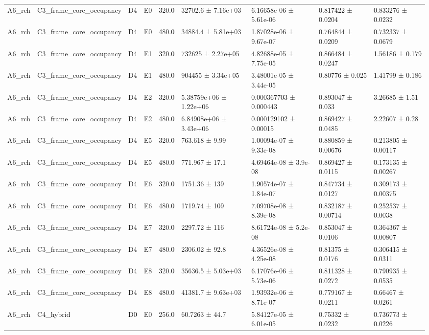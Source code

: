 \begin{table}
\begin{tabular}{lllllllll}
A6\_rch & C3\_frame\_core\_occupancy & D4 & E0 & 320.0 & 32702.6 ± 7.16e+03 & 6.16658e-06 ± 5.61e-06 & 0.817422 ± 0.0204 & 0.833276 ± 0.0232 \\
A6\_rch & C3\_frame\_core\_occupancy & D4 & E0 & 480.0 & 34884.4 ± 5.81e+03 & 1.87028e-06 ± 9.67e-07 & 0.764844 ± 0.0209 & 0.732337 ± 0.0679 \\
A6\_rch & C3\_frame\_core\_occupancy & D4 & E1 & 320.0 & 732625 ± 2.27e+05 & 4.82688e-05 ± 7.75e-05 & 0.866484 ± 0.0247 & 1.56186 ± 0.179 \\
A6\_rch & C3\_frame\_core\_occupancy & D4 & E1 & 480.0 & 904455 ± 3.34e+05 & 3.48001e-05 ± 3.44e-05 & 0.80776 ± 0.025 & 1.41799 ± 0.186 \\
A6\_rch & C3\_frame\_core\_occupancy & D4 & E2 & 320.0 & 5.38759e+06 ± 1.22e+06 & 0.000367703 ± 0.000443 & 0.893047 ± 0.033 & 3.26685 ± 1.51 \\
A6\_rch & C3\_frame\_core\_occupancy & D4 & E2 & 480.0 & 6.84908e+06 ± 3.43e+06 & 0.000129102 ± 0.00015 & 0.869427 ± 0.0485 & 2.22607 ± 0.28 \\
A6\_rch & C3\_frame\_core\_occupancy & D4 & E5 & 320.0 & 763.618 ± 9.99 & 1.00094e-07 ± 9.33e-08 & 0.880859 ± 0.00676 & 0.213805 ± 0.00117 \\
A6\_rch & C3\_frame\_core\_occupancy & D4 & E5 & 480.0 & 771.967 ± 17.1 & 4.69464e-08 ± 3.9e-08 & 0.869427 ± 0.0115 & 0.173135 ± 0.00267 \\
A6\_rch & C3\_frame\_core\_occupancy & D4 & E6 & 320.0 & 1751.36 ± 139 & 1.90574e-07 ± 1.84e-07 & 0.847734 ± 0.0127 & 0.309173 ± 0.00375 \\
A6\_rch & C3\_frame\_core\_occupancy & D4 & E6 & 480.0 & 1719.74 ± 109 & 7.09708e-08 ± 8.39e-08 & 0.832187 ± 0.00714 & 0.252537 ± 0.0038 \\
A6\_rch & C3\_frame\_core\_occupancy & D4 & E7 & 320.0 & 2297.72 ± 116 & 8.61724e-08 ± 5.2e-08 & 0.853047 ± 0.0106 & 0.364367 ± 0.00807 \\
A6\_rch & C3\_frame\_core\_occupancy & D4 & E7 & 480.0 & 2306.02 ± 92.8 & 4.36526e-08 ± 4.25e-08 & 0.81375 ± 0.0176 & 0.306415 ± 0.0311 \\
A6\_rch & C3\_frame\_core\_occupancy & D4 & E8 & 320.0 & 35636.5 ± 5.03e+03 & 6.17076e-06 ± 5.73e-06 & 0.811328 ± 0.0272 & 0.790935 ± 0.0535 \\
A6\_rch & C3\_frame\_core\_occupancy & D4 & E8 & 480.0 & 41381.7 ± 9.63e+03 & 1.93932e-06 ± 8.71e-07 & 0.779167 ± 0.0211 & 0.66467 ± 0.0261 \\
A6\_rch & C4\_hybrid & D0 & E0 & 256.0 & 60.7263 ± 44.7 & 5.84127e-05 ± 6.01e-05 & 0.75332 ± 0.0232 & 0.736773 ± 0.0226 \\

\end{tabular}
\end{table}
